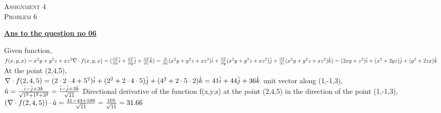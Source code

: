\documentclass{article}
\begin{document}
\begin{newpage}
    \begin{flushright}
    \textsc{Assignment 4}\\
    \textsc{Problem 6}\\
    [1 cm]
    \end{flushright}
\begin{center}
  \textbf{\Large \underline {Ans to the question no 06}}\\
  [0.5 cm]
\end{center}
\Large {Given function, \\[3mm]
$f(x,y,x)=x^2y + y^2z + xz^2\\[3mm]
\nabla \cdot f(x,y,x)=(\frac{\partial f}{\partial x}\hat{i}+\frac{\partial f}{\partial y}\hat{j}+\frac{\partial f}{\partial z}\hat{k})\\[3mm]
=\frac{\partial}{\partial x}(x^2y + y^2z + xz^2)\hat{i}+\frac{\partial f}{\partial y}(x^2y + y^2z + xz^2)\hat{j}+\frac{\partial f}{\partial z}(x^2y + y^2z + xz^2)\hat{k})\\[2mm]
=(2xy+z^2)\hat{i}+(x^2+2yz)\hat{j}+(y^2+2zx)\hat{k}\\[3mm]$
At the point (2,4,5),\\[3mm]
$\nabla \cdot f(2,4,5)=(2\cdot 2\cdot 4+5^2)\hat{i}+(2^2+2\cdot 4\cdot 5)\hat{j}+(4^2+2\cdot 5\cdot 2)\hat{k}\\[3mm]
=41\hat{i}+44\hat{j}+36\hat{k}\\[3mm]$
unit vector along (1,-1,3),\\[3mm]
$\hat{u}=\frac{\hat{i}-\hat{j}+3\hat{k}}{\sqrt{1^2+1^2+3^2}}\\[3mm]
=\frac{\hat{i}-\hat{j}+3\hat{k}}{\sqrt{11}}\\[3mm]$
Directional derivative of the function f(x,y,z) at the point (2,4,5) in the direction of the point (1,-1,3),\\[3mm]
$ (\nabla \cdot f(2,4,5))\cdot \hat{u}= \frac{41-44+108}{\sqrt{11}}\\[3mm]
=\frac{105}{\sqrt{11}}=31.66$}
\end{newpage}
\end{document}
